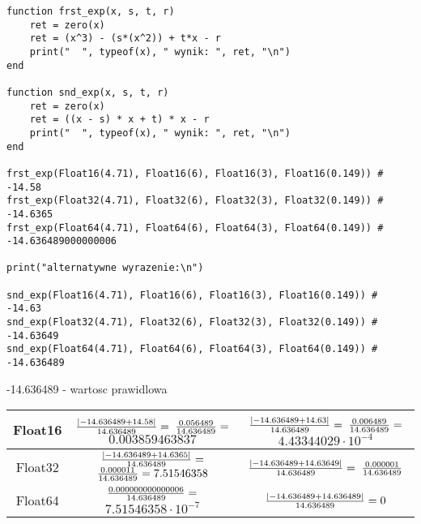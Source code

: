 \documentclass{article}[13pt]
\begin{document}
    \begin{lstlisting}[language=juleczka]
function frst_exp(x, s, t, r)
    ret = zero(x)
    ret = (x^3) - (s*(x^2)) + t*x - r
    print("  ", typeof(x), " wynik: ", ret, "\n")
end

function snd_exp(x, s, t, r)
    ret = zero(x)
    ret = ((x - s) * x + t) * x - r
    print("  ", typeof(x), " wynik: ", ret, "\n")
end

frst_exp(Float16(4.71), Float16(6), Float16(3), Float16(0.149)) # -14.58
frst_exp(Float32(4.71), Float32(6), Float32(3), Float32(0.149)) # -14.6365
frst_exp(Float64(4.71), Float64(6), Float64(3), Float64(0.149)) # -14.636489000000006

print("alternatywne wyrazenie:\n")

snd_exp(Float16(4.71), Float16(6), Float16(3), Float16(0.149)) # -14.63
snd_exp(Float32(4.71), Float32(6), Float32(3), Float32(0.149)) # -14.63649
snd_exp(Float64(4.71), Float64(6), Float64(3), Float64(0.149)) # -14.636489
    \end{lstlisting}

    -14.636489 - wartosc prawidlowa

    {\renewcommand{\arraystretch}{2}
    \begin{tabular}{| c | c | c |}
        \hline

        Float16 & ${|-14.636489+14.58|\over 14.636489}=$ ${0.056489\over14.636489}=$ $0.003859463837$ & ${|-14.636489 + 14.63|\over14.636489}=$ ${0.006489\over14.636489}=$ $4.43344029\cdot 10^{-4}$ \\

        \hline

        Float32 & ${|-14.636489 + 14.6365|\over14.636489}=$ ${0.000011\over14.636489}=7.51546358$ & ${|-14.636489 + 14.63649|\over14.636489}=$ ${0.000001\over14.636489}$ \\

        \hline

        Float64 & ${0.000000000000006\over14.636489}=$ $7.51546358\cdot10^{-7}$ & ${|-14.636489 + 14.636489|\over14.636489}=0$ \\

        \hline
    \end{tabular}}
\end{document}
